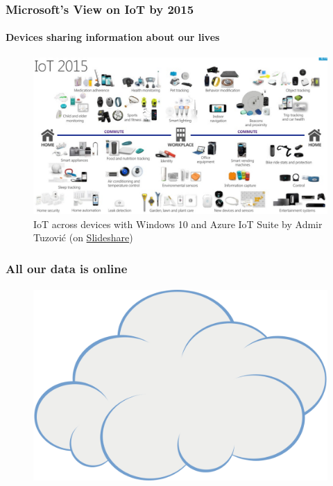 	\begin{frame}
	\frametitle{Microsoft's View on IoT by 2015}
	\framesubtitle{Devices sharing information about our lives}
	        \begin{figure}[h]
                \centering
                \includegraphics[width=.8\textwidth]{../pics/msft-IoT2015}
		\caption{IoT across devices with Windows 10 and Azure IoT Suite by Admir Tuzović (on \href{http://www.slideshare.net/BosniaAgile/iot-across-devices-with-windows-10-and-azure-iot-suite-by-admir-tuzovi}{Slideshare})}
        	\end{figure}
	\end{frame}

	\begin{frame}
	\frametitle{All our data is online}
	\framesubtitle{}
	        \begin{figure}[h]
                \centering
                \includegraphics[width=.8\textwidth]{../pics/Cartoon_cloud.png}
        	\end{figure}
	\end{frame}

